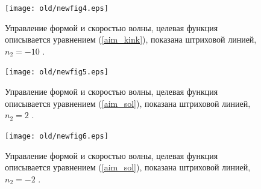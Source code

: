 \begin{figure}[!ht]
	\begin{center}
		\texttt{[image: old/newfig4.eps]}
	\end{center}
	\caption{\label{f:fig4}Управление формой и скоростью волны, целевая функция описывается уравнением (\ref{aim_kink}), показана штриховой линией, $n_2 = -10$ \cite{porant16}.}
\end{figure}

%
%

\begin{figure}[!ht]
	\begin{center}
		\texttt{[image: old/newfig5.eps]}
	\end{center}
	\caption{\label{f:fig5}Управление формой и скоростью волны, целевая функция описывается уравнением (\ref{aim_sol}), показана штриховой линией, $n_2 = 2$ \cite{porant16}.}
\end{figure}
\begin{figure}[!ht]
	\begin{center}
		\texttt{[image: old/newfig6.eps]}
	\end{center}
	\caption{\label{f:fig6}Управление формой и скоростью волны, целевая функция описывается уравнением (\ref{aim_sol}), показана штриховой линией, $n_2 = -2$ \cite{porant16}.}
\end{figure}

%

